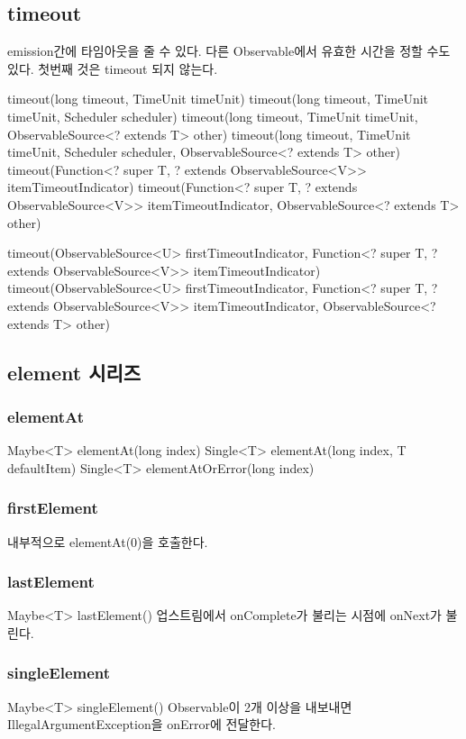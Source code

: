 \documentclass{book}
\begin{document}
{\subsection{timeout}
emission간에 타임아웃을 줄 수 있다.
다른 Observable에서 유효한 시간을 정할 수도 있다. 
첫번째 것은 timeout 되지 않는다.

timeout(long timeout, TimeUnit timeUnit)
timeout(long timeout, TimeUnit timeUnit, Scheduler scheduler)
timeout(long timeout, TimeUnit timeUnit, ObservableSource<? extends T> other)
timeout(long timeout, TimeUnit timeUnit, Scheduler scheduler, ObservableSource<? extends T> other)
timeout(Function<? super T, ? extends ObservableSource<V>> itemTimeoutIndicator)
timeout(Function<? super T, ? extends ObservableSource<V>> itemTimeoutIndicator,
            ObservableSource<? extends T> other)

timeout(ObservableSource<U> firstTimeoutIndicator,
            Function<? super T, ? extends ObservableSource<V>> itemTimeoutIndicator)
timeout(ObservableSource<U> firstTimeoutIndicator,
            Function<? super T, ? extends ObservableSource<V>> itemTimeoutIndicator,
                    ObservableSource<? extends T> other)                        

\subsection{element 시리즈}
\subsubsection{elementAt}
Maybe<T> elementAt(long index)
Single<T> elementAt(long index, T defaultItem)
Single<T> elementAtOrError(long index)

\subsubsection{firstElement}
내부적으로 elementAt(0)을 호출한다. 

\subsubsection{lastElement}
Maybe<T> lastElement()
업스트림에서 onComplete가 불리는 시점에 onNext가 불린다. 

\subsubsection{singleElement}
Maybe<T> singleElement()
Observable이 2개 이상을 내보내면 IllegalArgumentException을 onError에 전달한다.

}
\end{document}
